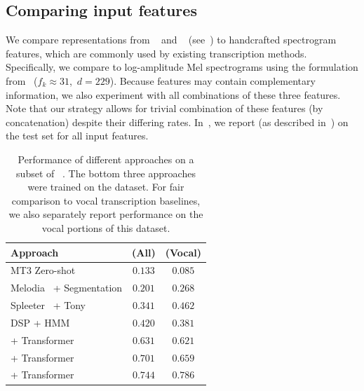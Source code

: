 \subsection{Comparing input features}
\label{sec:exp1}

We compare representations from \jukebox~\cite{dhariwal2020jukebox} and \mtthree~\cite{gardner2021mt3} (see~) to handcrafted spectrogram features, 
which are commonly used by existing transcription methods.
Specifically, we compare to log-amplitude Mel spectrograms using the formulation from~\cite{hawthorne2017onsets} (${f_k \approx 31}$,~${d = 229}$). 
Because features may contain complementary information, we also experiment with all combinations of these three features. 
Note that our \beatpooling{} strategy allows for trivial combination of these features (by concatenation) despite their differing rates. 
In~, we report \fone{} (as described in~) on the \hooktheory{} test set for all input features.

\begin{table}[t]
    \centering
    \begin{tabular}{lcc}
\toprule
Approach & \fone{} (All) & \fone{} (Vocal)\\
\midrule
MT3 Zero-shot~\cite{gardner2021mt3} & $0.133$ & $0.085$ \\
Melodia~\cite{salamon2012melody} + Segmentation & $0.201$ & $0.268$ \\
Spleeter~\cite{hennequin2020spleeter} + Tony~\cite{mauch2015computer} & $0.341$ & $\bm{0.462}$ \\
DSP + HMM~\cite{ryynanen2008automatic} & $\bm{0.420}$ & $0.381$ \\
\midrule
\mel{} + Transformer & $0.631$ & $0.621$ \\
\mtthree{} + Transformer & $0.701$ & $0.659$ \\
\jukebox{} + Transformer & $\mathbf{0.744}$ & $\mathbf{0.786}$ \\
\bottomrule
    \end{tabular}
    \caption{Performance of different approaches on a subset of \rwc~\cite{goto2002rwc,goto2003rwc,goto2004development}. The bottom three approaches were trained on the \hooktheory{} dataset. For fair comparison to vocal transcription baselines, we also separately report performance on the vocal portions of this dataset.}
    \label{tab:rwc_ryy}
    \vspace{-4mm}
\end{table}


